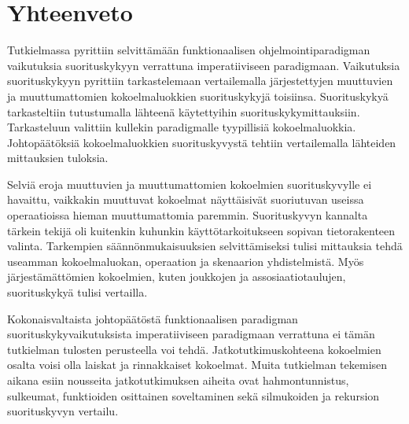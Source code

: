 \chapter{Yhteenveto} \label{Yhteenveto}
Tutkielmassa pyrittiin selvittämään funktionaalisen ohjelmointiparadigman vaikutuksia suorituskykyyn verrattuna imperatiiviseen paradigmaan. Vaikutuksia suorituskykyyn pyrittiin tarkastelemaan vertailemalla järjestettyjen muuttuvien ja muuttumattomien kokoelmaluokkien suorituskykyjä toisiinsa. Suorituskykyä tarkasteltiin tutustumalla lähteenä käytettyihin suorituskykymittauksiin. Tarkasteluun valittiin kullekin paradigmalle tyypillisiä kokoelmaluokkia. Johtopäätöksiä kokoelmaluokkien suorituskyvystä tehtiin vertailemalla lähteiden mittauksien tuloksia. 

Selviä eroja muuttuvien ja muuttumattomien kokoelmien suorituskyvylle ei havaittu, vaikkakin muuttuvat kokoelmat näyttäisivät suoriutuvan useissa operaatioissa hieman muuttumattomia paremmin. Suorituskyvyn kannalta tärkein tekijä oli kuitenkin kuhunkin käyttötarkoitukseen sopivan tietorakenteen valinta. Tarkempien säännönmukaisuuksien selvittämiseksi tulisi mittauksia tehdä useamman kokoelmaluokan, operaation ja skenaarion yhdistelmistä. Myös järjestämättömien kokoelmien, kuten joukkojen ja assosiaatiotaulujen, suorituskykyä tulisi vertailla.

Kokonaisvaltaista johtopäätöstä funktionaalisen paradigman suorituskykyvaikutuksista imperatiiviseen paradigmaan verrattuna ei tämän tutkielman tulosten perusteella voi tehdä. Jatkotutkimuskohteena kokoelmien osalta voisi olla laiskat ja rinnakkaiset kokoelmat. Muita tutkielman tekemisen aikana esiin nousseita jatkotutkimuksen aiheita ovat hahmontunnistus, sulkeumat, funktioiden osittainen soveltaminen sekä silmukoiden ja rekursion suorituskyvyn vertailu.
